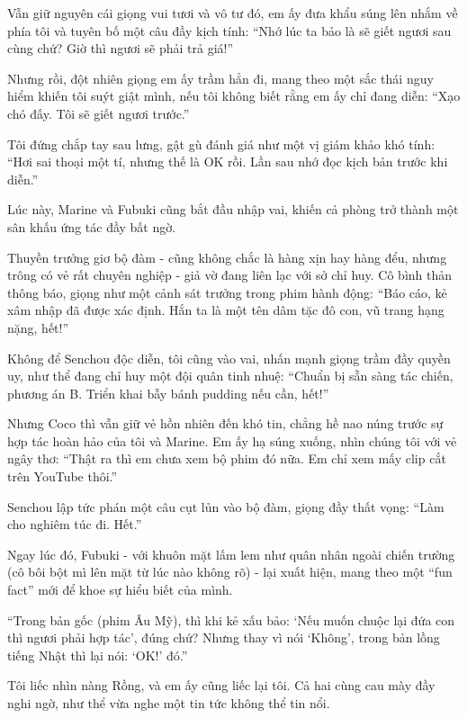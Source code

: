 \documentclass[../main.tex]{subfiles}
\begin{document}

Vẫn giữ nguyên cái giọng vui tươi và vô tư đó, em ấy đưa khẩu súng lên nhắm về phía tôi và tuyên bố một câu đầy kịch tính: ``Nhớ lúc ta bảo là sẽ giết ngươi sau cùng chứ? Giờ thì ngươi sẽ phải trả giá!''

Nhưng rồi, đột nhiên giọng em ấy trầm hẳn đi, mang theo một sắc thái nguy hiểm khiến tôi suýt giật mình, nếu tôi không biết rằng em ấy chỉ đang diễn: ``Xạo chó đấy. Tôi sẽ giết ngươi trước.''

Tôi đứng chắp tay sau lưng, gật gù đánh giá như một vị giám khảo khó tính: ``Hơi sai thoại một tí, nhưng thế là OK rồi. Lần sau nhớ đọc kịch bản trước khi diễn.''

Lúc này, Marine và Fubuki cũng bắt đầu nhập vai, khiến cả phòng trở thành một sân khấu ứng tác đầy bất ngờ.

Thuyền trưởng giơ bộ đàm - cũng không chắc là hàng xịn hay hàng đểu, nhưng trông có vẻ rất chuyên nghiệp - giả vờ đang liên lạc với sở chỉ huy. Cô bình thản thông báo, giọng như một cảnh sát trưởng trong phim hành động: ``Báo cáo, kẻ xâm nhập đã được xác định. Hắn ta là một tên dâm tặc đô con, vũ trang hạng nặng, hết!''


Không để Senchou độc diễn, tôi cũng vào vai, nhấn mạnh giọng trầm đầy quyền uy, như thể đang chỉ huy một đội quân tinh nhuệ: ``Chuẩn bị sẵn sàng tác chiến, phương án B. Triển khai bẫy bánh pudding nếu cần, hết!''

Nhưng Coco thì vẫn giữ vẻ hồn nhiên đến khó tin, chẳng hề nao núng trước sự hợp tác hoàn hảo của tôi và Marine. Em ấy hạ súng xuống, nhìn chúng tôi với vẻ ngây thơ: ``Thật ra thì em chưa xem bộ phim đó nữa. Em chỉ xem mấy clip cắt trên YouTube thôi.''

Senchou lập tức phán một câu cụt lủn vào bộ đàm, giọng đầy thất vọng: ``Làm cho nghiêm túc đi. Hết.''

\il

Ngay lúc đó, Fubuki - với khuôn mặt lấm lem như quân nhân ngoài chiến trường (cô bôi bột mì lên mặt từ lúc nào không rõ) - lại xuất hiện, mang theo một ``fun fact'' mới để khoe sự hiểu biết của mình.


``Trong bản gốc (phim Âu Mỹ), thì khi kẻ xấu bảo: `Nếu muốn chuộc lại đứa con thì ngươi phải hợp tác', đúng chứ? Nhưng thay vì nói `Không', trong bản lồng tiếng Nhật thì lại nói: `OK!' đó.''

Tôi liếc nhìn nàng Rồng, và em ấy cũng liếc lại tôi. Cả hai cùng cau mày đầy nghi ngờ, như thể vừa nghe một tin tức không thể tin nổi.
\end{document}
